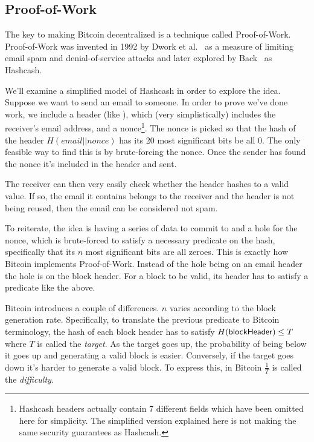 \subsection{Proof-of-Work}

The key to making Bitcoin decentralized is a technique called Proof-of-Work. Proof-of-Work was invented in 1992 by Dwork et al.~\cite{dwork} as a measure of limiting email spam and denial-of-service attacks and later explored by Back~\cite{hashcash} as Hashcash.

We'll examine a simplified model of Hashcash in order to explore the idea. Suppose we want to send an email to someone. In order to prove we've done work, we include a header (like ), which (very simplistically) includes the receiver's email address, and a nonce\footnote{Hashcash headers actually contain 7 different fields which have been omitted here for simplicity. The simplified version explained here is not making the same security guarantees as Hashcash.}.
The nonce is picked so that the hash of the header $H(email || nonce)$ has its 20 most significant bits be all 0. The only feasible way to find this is by brute-forcing the nonce. Once the sender has found the nonce it's included in the header and sent.

The receiver can then very easily check whether the header hashes to a valid value. If so, the email it contains belongs to the receiver and the header is not being reused, then the email can be considered not spam.

To reiterate, the idea is having a series of data to commit to and a hole for the nonce, which is brute-forced to satisfy a necessary predicate on the hash, specifically that its $n$  most significant bits are all zeroes. This is exactly how Bitcoin implements Proof-of-Work. Instead of the hole being on an email header the hole is on the block header. For a block to be valid, its header has to satisfy a predicate like the above.

Bitcoin introduces a couple of differences. $n$ varies according to the block generation rate. Specifically, to translate the previous predicate to Bitcoin terminology, the hash of each block header has to satisfy $H({\sf blockHeader}) \le T$ where $T$ is called the \emph{target}. As the target goes up, the probability of being below it goes up and generating a valid block is easier. Conversely, if the target goes down it's harder to generate a valid block. To express this, in Bitcoin $\frac{1}{T}$ is called the \emph{difficulty}.

